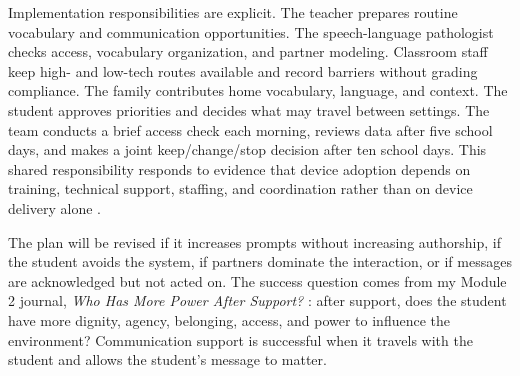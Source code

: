 \documentclass[11pt]{article}
\begin{document}
Implementation responsibilities are explicit. The teacher prepares routine vocabulary and communication opportunities. The speech-language pathologist checks access, vocabulary organization, and partner modeling. Classroom staff keep high- and low-tech routes available and record barriers without grading compliance. The family contributes home vocabulary, language, and context. The student approves priorities and decides what may travel between settings. The team conducts a brief access check each morning, reviews data after five school days, and makes a joint keep/change/stop decision after ten school days. This shared responsibility responds to evidence that device adoption depends on training, technical support, staffing, and coordination rather than on device delivery alone \citep{norrie2021context}.

The plan will be revised if it increases prompts without increasing authorship, if the student avoids the system, if partners dominate the interaction, or if messages are acknowledged but not acted on. The success question comes from my Module 2 journal, \textit{Who Has More Power After Support?} \citep{garciabautista2026module2journal}: after support, does the student have more dignity, agency, belonging, access, and power to influence the environment? Communication support is successful when it travels with the student and allows the student's message to matter.

\newpage
\small

\end{document}
